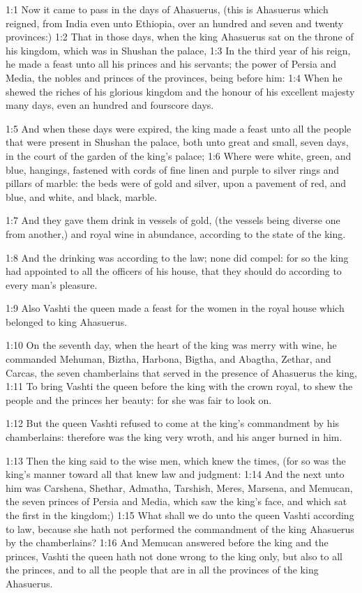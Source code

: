 

1:1 Now it came to pass in the days of Ahasuerus, (this is Ahasuerus
which reigned, from India even unto Ethiopia, over an hundred and
seven and twenty provinces:) 1:2 That in those days, when the king
Ahasuerus sat on the throne of his kingdom, which was in Shushan the
palace, 1:3 In the third year of his reign, he made a feast unto all
his princes and his servants; the power of Persia and Media, the
nobles and princes of the provinces, being before him: 1:4 When he
shewed the riches of his glorious kingdom and the honour of his
excellent majesty many days, even an hundred and fourscore days.

1:5 And when these days were expired, the king made a feast unto all
the people that were present in Shushan the palace, both unto great
and small, seven days, in the court of the garden of the king's
palace; 1:6 Where were white, green, and blue, hangings, fastened with
cords of fine linen and purple to silver rings and pillars of marble:
the beds were of gold and silver, upon a pavement of red, and blue,
and white, and black, marble.

1:7 And they gave them drink in vessels of gold, (the vessels being
diverse one from another,) and royal wine in abundance, according to
the state of the king.

1:8 And the drinking was according to the law; none did compel: for so
the king had appointed to all the officers of his house, that they
should do according to every man's pleasure.

1:9 Also Vashti the queen made a feast for the women in the royal
house which belonged to king Ahasuerus.

1:10 On the seventh day, when the heart of the king was merry with
wine, he commanded Mehuman, Biztha, Harbona, Bigtha, and Abagtha,
Zethar, and Carcas, the seven chamberlains that served in the presence
of Ahasuerus the king, 1:11 To bring Vashti the queen before the king
with the crown royal, to shew the people and the princes her beauty:
for she was fair to look on.

1:12 But the queen Vashti refused to come at the king's commandment by
his chamberlains: therefore was the king very wroth, and his anger
burned in him.

1:13 Then the king said to the wise men, which knew the times, (for so
was the king's manner toward all that knew law and judgment: 1:14 And
the next unto him was Carshena, Shethar, Admatha, Tarshish, Meres,
Marsena, and Memucan, the seven princes of Persia and Media, which saw
the king's face, and which sat the first in the kingdom;) 1:15 What
shall we do unto the queen Vashti according to law, because she hath
not performed the commandment of the king Ahasuerus by the
chamberlains?  1:16 And Memucan answered before the king and the
princes, Vashti the queen hath not done wrong to the king only, but
also to all the princes, and to all the people that are in all the
provinces of the king Ahasuerus.

